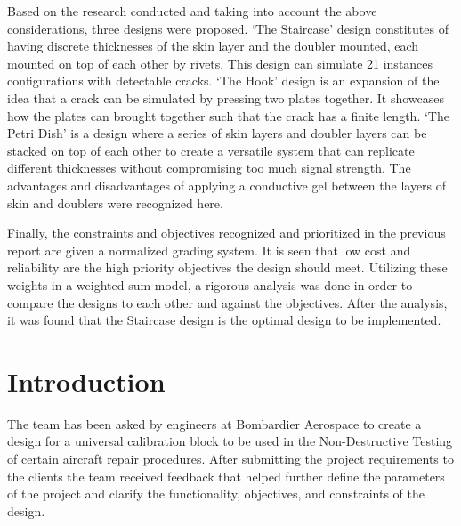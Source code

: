 \documentclass[12pt]{article}
\begin{document}
Based on the research conducted and taking into account the above considerations, three designs were proposed. `The Staircase' design constitutes of having discrete thicknesses of the skin layer and the doubler mounted, each mounted on top of each other by rivets. This design can simulate 21 instances configurations with detectable cracks. `The Hook' design is an expansion of the idea that a crack can be simulated by pressing two plates together. It showcases how the plates can brought together such that the crack has a finite length. `The Petri Dish' is a design where a series of skin layers and doubler layers can be stacked on top of each other to create a versatile system that can replicate different thicknesses without compromising too much signal strength. The advantages and disadvantages of applying a conductive gel between the layers of skin and doublers were recognized here.

Finally, the constraints and objectives recognized and prioritized in the previous report are given a normalized grading system. It is seen that low cost and reliability are the high priority objectives the design should meet. Utilizing these weights in a weighted sum model, a rigorous analysis was done in order to compare the designs to each other and against the objectives. After the analysis, it was found that the Staircase design is the optimal design to be implemented.

\newpage

\renewcommand{\contentsname}{\textsc{Contents}}
\newpage
\textsc{\tableofcontents}
\newpage

\sectionfont{\scshape}


\section{Introduction}
The team has been asked by engineers at Bombardier Aerospace to create a design for a universal calibration block to be used in the Non-Destructive Testing of certain aircraft repair procedures. After submitting the project requirements to the clients the team received feedback that helped further define the parameters of the project and clarify the functionality, objectives, and constraints of the design.
\end{document}
